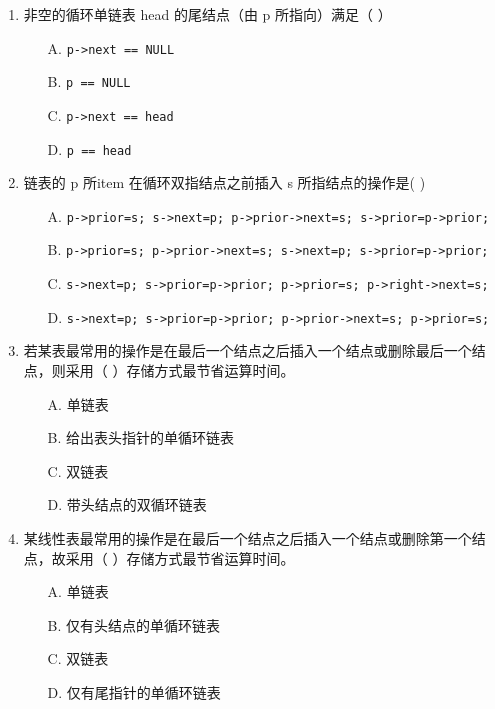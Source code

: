 \documentclass[12pt, a4paper]{article}
\begin{document}
\begin{enumerate}[label=\arabic*.]
	\item 非空的循环单链表 head 的尾结点（由 p 所指向）满足（ ）
	      \begin{enumerate}
		      \item[A.] \texttt{p->next == NULL}
		      \item[B.] \texttt{p == NULL}
		      \item[C.] \texttt{p->next == head}
		      \item[D.] \texttt{p == head}
	      \end{enumerate}

		\item 链表的 p 所item 在循环双指结点之前插入 s 所指结点的操作是( )
	      \begin{enumerate}
		      \item[A.] \texttt{p->prior=s; s->next=p; p->prior->next=s; s->prior=p->prior;}
		      \item[B.] \texttt{p->prior=s; p->prior->next=s; s->next=p; s->prior=p->prior;}
		      \item[C.] \texttt{s->next=p; s->prior=p->prior; p->prior=s; p->right->next=s;}
		      \item[D.] \texttt{s->next=p; s->prior=p->prior; p->prior->next=s; p->prior=s;}
	      \end{enumerate}

	\item 若某表最常用的操作是在最后一个结点之后插入一个结点或删除最后一个结点，则采用（ ）存储方式最节省运算时间。
	      \begin{enumerate}
		      \item[A.] 单链表
		      \item[B.] 给出表头指针的单循环链表
		      \item[C.] 双链表
		      \item[D.] 带头结点的双循环链表
	      \end{enumerate}

	\item 某线性表最常用的操作是在最后一个结点之后插入一个结点或删除第一个结点，故采用（ ）存储方式最节省运算时间。
	      \begin{enumerate}
		      \item[A.] 单链表
		      \item[B.] 仅有头结点的单循环链表
		      \item[C.] 双链表
		      \item[D.] 仅有尾指针的单循环链表
	      \end{enumerate}


\end{enumerate}
\end{document}
